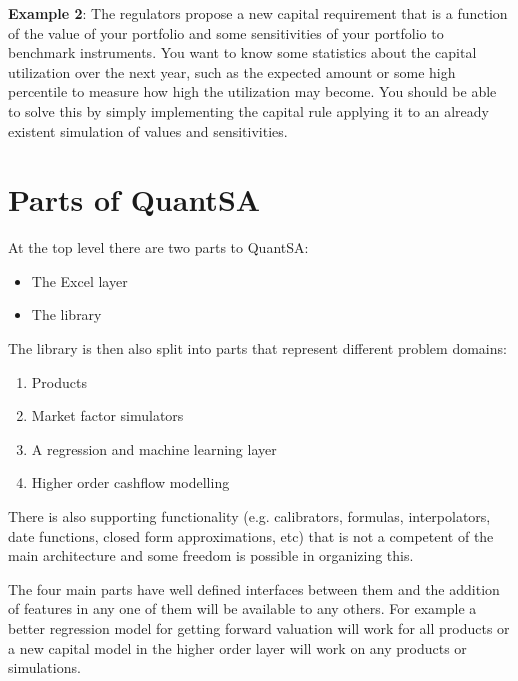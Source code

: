 \documentclass[a4paper,10pt]{article}
\begin{document}
\textbf{Example 2}: The regulators propose a new capital requirement that is a function of the value of your portfolio and some sensitivities of your portfolio to benchmark instruments.  You want to know some statistics about the capital utilization over the next year, such as the expected amount or some high percentile to measure how high the utilization may become.  You should be able to solve this by simply implementing the capital rule applying it to an already existent simulation of values and sensitivities.

\section{Parts of QuantSA}
At the top level there are two parts to QuantSA:
\begin{itemize}
	\item The Excel layer
	\item The library
\end{itemize}
The library is then also split into parts that represent different problem domains:
\begin{enumerate}
	\item Products
	\item Market factor simulators
	\item A regression and machine learning layer
	\item Higher order cashflow modelling
\end{enumerate}
There is also supporting functionality (e.g. calibrators, formulas, interpolators, date functions, closed form approximations, etc) that is not a competent of the main architecture and some freedom is possible in organizing this.  	

The four main parts have well defined interfaces between them and the addition of features in any one of them will be available to any others.  For example a better regression model for getting forward valuation will work for all products or a new capital model in the higher order layer will work on any products or simulations.


\end{document}
